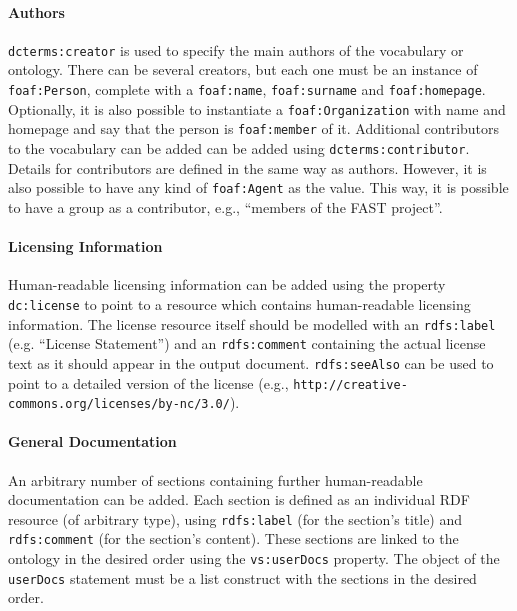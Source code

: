 \documentclass{article}
\begin{document}


\paragraph{Authors} %
\label{par:authors}

\texttt{dcterms:creator}  is used to specify the main authors of the vocabulary or ontology. There can be several creators, but each one must be an instance of \texttt{foaf:Person}, complete with a \texttt{foaf:name}, \texttt{foaf:surname} and \texttt{foaf:homepage}. Optionally, it is also possible to instantiate a \texttt{foaf:Organization} with name and homepage and say that the person is \texttt{foaf:member} of it. Additional  contributors to the vocabulary can be added can be added using \texttt{dcterms:contributor}. Details for contributors are defined in the same way as authors. However, it is also possible to have any kind of \texttt{foaf:Agent} as the value. This way, it is possible to have a group as a contributor, e.g., ``members of the FAST project''.


\paragraph{Licensing Information} %
\label{par:licensing_information}

Human-readable licensing information can be added using the property \texttt{dc:license} to point to a resource which contains human-readable licensing information. The license resource itself should be modelled with an \texttt{rdfs:label} (e.g. ``License Statement'') and an \texttt{rdfs:comment} containing the actual license text as it should appear in the output document. \texttt{rdfs:seeAlso} can be used to point to a detailed version of the license (e.g., \texttt{http://creative-commons.org/licenses/by-nc/3.0/}).


\paragraph{General Documentation} %
\label{par:general_documentation}

An arbitrary number of sections containing further human-readable documentation can be added. Each section is defined as an individual RDF resource (of arbitrary type), using \texttt{rdfs:label} (for the section's title) and \texttt{rdfs:comment} (for the section's content). These sections are linked to the ontology in the desired order using the \texttt{vs:userDocs} property. The object of the \texttt{userDocs} statement must be a list construct with the sections in the desired order.
\end{document}
